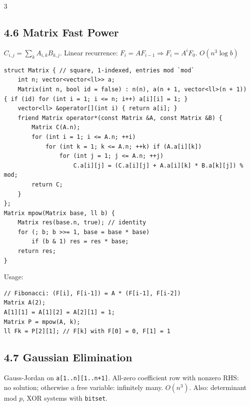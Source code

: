 \documentclass[8pt]{extarticle}
\begin{document}
\begin{multicols*}{3}
\subsection*{4.6 Matrix Fast Power}

$C_{i,j} = \sum_k A_{i,k} B_{k,j}$. Linear recurrence: $F_i = A F_{i-1} \Rightarrow F_i = A^i F_0$. $O(n^3 \log b)$

\begin{lstlisting}
struct Matrix { // square, 1-indexed, entries mod `mod`
    int n; vector<vector<ll>> a;
    Matrix(int n, bool id = false) : n(n), a(n + 1, vector<ll>(n + 1)) { if (id) for (int i = 1; i <= n; i++) a[i][i] = 1; }
    vector<ll> &operator[](int i) { return a[i]; }
    friend Matrix operator*(const Matrix &A, const Matrix &B) {
        Matrix C(A.n);
        for (int i = 1; i <= A.n; ++i)
            for (int k = 1; k <= A.n; ++k) if (A.a[i][k])
                for (int j = 1; j <= A.n; ++j)
                    C.a[i][j] = (C.a[i][j] + A.a[i][k] * B.a[k][j]) % mod;
        return C;
    }
};
Matrix mpow(Matrix base, ll b) {
    Matrix res(base.n, true); // identity
    for (; b; b >>= 1, base = base * base)
        if (b & 1) res = res * base;
    return res;
}
\end{lstlisting}

Usage:

\begin{lstlisting}
// Fibonacci: (F[i], F[i-1]) = A * (F[i-1], F[i-2])
Matrix A(2);
A[1][1] = A[1][2] = A[2][1] = 1;
Matrix P = mpow(A, k);
ll Fk = P[2][1]; // F[k] with F[0] = 0, F[1] = 1
\end{lstlisting}

\subsection*{4.7 Gaussian Elimination}

Gauss-Jordan on \texttt{a[1..n][1..n+1]}. All-zero coefficient row with nonzero RHS: no solution; otherwise a free variable: infinitely many. $O(n^3)$. Also: determinant mod $p$, XOR systems with \texttt{bitset}.


\end{multicols*}
\end{document}
